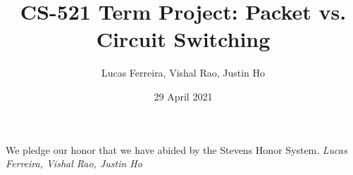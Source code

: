 \documentclass{article}
\title{CS-521 Term Project: Packet vs. Circuit Switching}
\author{Lucas Ferreira, Vishal Rao, Justin Ho}
\date{29 April 2021}
\begin{document}
  \maketitle

  {\flushleft We pledge our honor that we have abided by the Stevens Honor System.
  \textit{Lucas Ferreira, Vishal Rao, Justin Ho}}

  
\end{document}
